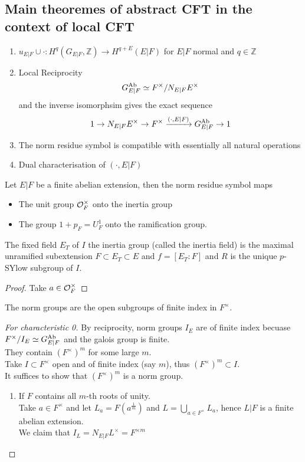\documentclass[../main.tex]{subfiles}
\begin{document}
\subsection{Main theoremes of abstract CFT in the context of local CFT}
\begin{enumerate}
\item $ u_{E|F} \cup \cdot : H^{q}( G_{E|F} , \mathbb{Z}) \to H^{q+E}( E|F) $ for $E|F$ normal and $q\in \mathbb{Z}$ 
\item Local Reciprocity
	\[ 
	G_{E|F}^{\operatorname{Ab}}\simeq  F^{\times} / N_{E|F} E^{\times}
	\]
	and the inverse isomorphsim gives the exact sequence
	\[ 
		1\to N_{E|F} E^{\times} \to F^{\times} \xrightarrow{ ( \cdot,E|F) } G_{E|F}^{\operatorname{Ab}}\to 1
	\]
	
\item The norm residue symbol is compatible with essentially all natural operations
\item Dual characterisation of $ ( \cdot, E|F) $ 
\end{enumerate}
\begin{thm}
	Let $E|F$ be a finite abelian extension, then the norm residue symbol maps 
	\begin{itemize}
	\item The unit group $\mathcal{O}_F^{\times}$ onto the inertia group
	\item The group $1+ p_F = U^{1}_F$ onto the ramification group.
	\end{itemize}
\end{thm}
The fixed field $E_T$ of $I$ the inertia group   (called the inertia field) is the maximal unramified subextension $F \subset E_T \subset E$  and $f= [ E_T:F]$ and $R$ is the unique $p$-SYlow subgroup of $I$.
\begin{proof}
Take $a\in \mathcal{O}_F^{\times}$ 
\end{proof}
\begin{thm}
	The norm groups are the open subgroups of finite index in $F^{\times}$.
\end{thm}
\begin{proof}[For characteristic 0]
By reciprocity, norm groups $I_E$ are of finite index becuase $F^{\times} /I_E\simeq G_{E|F}^{\operatorname{Ab}}$ and the galois group is finite.\\
They contain $( F^{\times})^{m}$ for some large $m$.\\
Take $I \subset F^{\times}$ open and of finite index (say $m$), thus $( F^{\times})^{m}\subset I$.\\
It suffices to show that $( F^{\times})^{m}$ is a norm group.
\begin{enumerate}
\item If $F$ contains all $m$-th roots of unity.\\
	Take $a\in F^{\times}$ and let $L_a = F( a^{\frac{1}{m}} ) $ and $L= \bigcup_{a\in F^{\times}} L_a$, hence $L|F$ is a finite abelian extension.\\
	We claim that $I_L = N_{E|F} L^{\times}= F^{\times m}$ 
\end{enumerate}

\end{proof}
\end{document}
